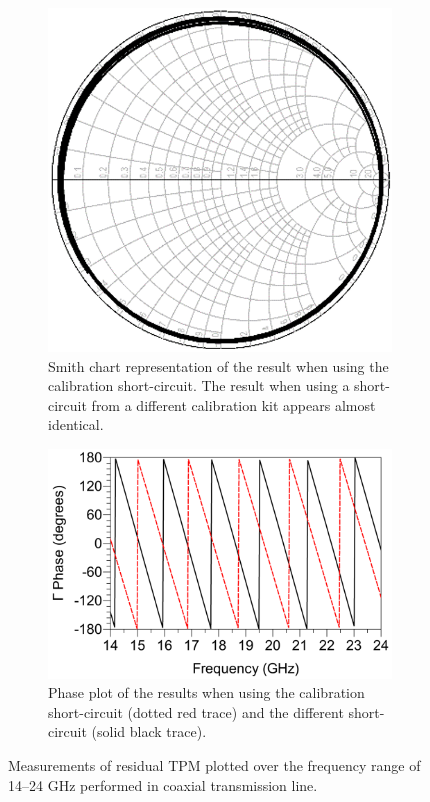 \documentclass[../thesis/thesis.tex]{subfiles}
\begin{document}
\begin{refsection}
\begin{figure}
	\centering
	\begin{subfigure}{0.37\textwidth}
		\centering
		\includegraphics[width=0.9\linewidth]{tpm-a.png}
		\caption{Smith chart representation of the result when using the calibration short-circuit. The result when using a short-circuit from a different calibration kit appears almost identical.}
	\end{subfigure}\hfill%
	\begin{subfigure}{0.6\textwidth}
		\centering
		\includegraphics[width=0.9\linewidth]{tpm-b.png}
		\caption{Phase plot of the results when using the calibration short-circuit (dotted red trace) and the different short-circuit (solid black trace).}
	\end{subfigure}
	\caption[Measurements of residual TPM performed in coaxial transmission line.]{Measurements of residual TPM plotted over the frequency range of 14--24 GHz performed in coaxial transmission line.}
	\label{ch4_fig_tpm}
\end{figure}


\end{refsection}
\end{document}
